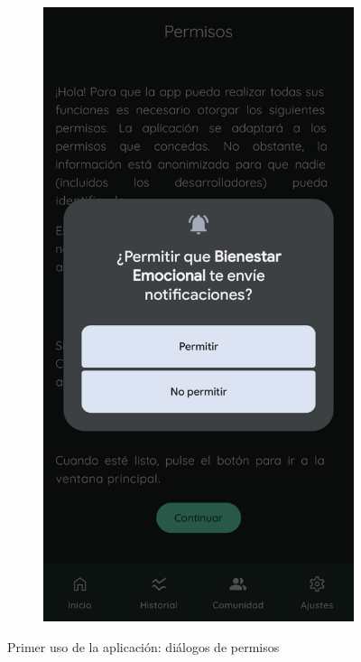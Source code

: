 \begin{figure}[htbp]
\begin{subfigure}[c]{0.32\textwidth}
                \end{subfigure}
                \hspace{0.1\textwidth}
                \begin{subfigure}[c]{0.32\textwidth}
                    \centering
                    \includegraphics[width=1\linewidth]{figures/pruebas/primer_uso/Notificaciones.png}
                \end{subfigure}
                \caption{Primer uso de la aplicación: diálogos de permisos}
                \label{figure:pruebas:primer_uso_permisos_dialogos}
            \end{figure}

